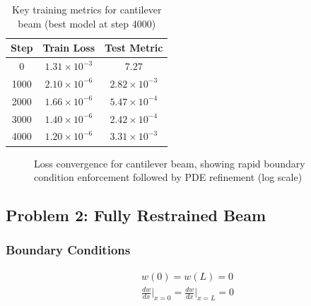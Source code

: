 \documentclass[12pt]{article}
\begin{document}
\begin{table}[htbp]
	\centering
	\begin{tabular}{c c c}
		\toprule
		\textbf{Step} & \textbf{Train Loss} & \textbf{Test Metric} \\
		\midrule
		0 & $1.31 \times 10^{-3}$ & $7.27$ \\
		1000 & $2.10 \times 10^{-6}$ & $2.82 \times 10^{-3}$ \\
		2000 & $1.66 \times 10^{-6}$ & $5.47 \times 10^{-4}$ \\
		3000 & $1.40 \times 10^{-6}$ & $2.42 \times 10^{-4}$ \\
		4000 & $1.20 \times 10^{-6}$ & $3.31 \times 10^{-3}$ \\
		\bottomrule
	\end{tabular}
	\caption{Key training metrics for cantilever beam (best model at step 4000)}
\end{table}

\begin{figure}[htbp]
	\centering
	\caption{Loss convergence for cantilever beam, showing rapid boundary condition enforcement followed by PDE refinement (log scale)}
	\label{fig:cantilever_convergence}
\end{figure}

\subsection{Problem 2: Fully Restrained Beam}
\subsubsection{Boundary Conditions}
\begin{align}
	&w(0) = w(L) = 0 \label{eq:restrained_bc1} \\
	&\frac{dw}{dx}\Big|_{x=0} = \frac{dw}{dx}\Big|_{x=L} = 0 \label{eq:restrained_bc2}
\end{align}
\end{document}
